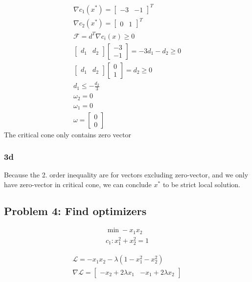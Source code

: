 \begin{subequations}
    \begin{align}
    \nabla c_1(x^*) = \begin{bmatrix}
        -3 & -1
    \end{bmatrix}^T \\ 
    \nabla c_2(x^*) = \begin{bmatrix}
        0 & 1
    \end{bmatrix}^T \\ 
    \mathcal{F} = d^T\nabla c_i(x) \geq 0 \\ 
    \begin{bmatrix}
        d_1 & d_2
    \end{bmatrix}\begin{bmatrix}
        -3 \\ 
        -1
    \end{bmatrix} = -3d_1-d_2 \geq 0 \\ 
    \begin{bmatrix}
        d_1 & d_2
    \end{bmatrix}\begin{bmatrix}
        0 \\ 
        1
    \end{bmatrix} = d_2 \geq 0 \\ 
    d_1 \leq -\frac{d_2}{3} \\ 
    \omega_2 = 0 \\ 
    \omega_1 = 0 \\ 
    \omega = \begin{bmatrix}
        0 \\ 
        0
    \end{bmatrix}
\end{align}
\end{subequations}
The critical cone only contains zero vector
\subsubsection{3d}
Because the 2. order inequality are for vectors excluding zero-vector, and we only have zero-vector in critical cone, we can conclude $x^*$ to be strict local solution.

\subsection{Problem 4: Find optimizers}

\begin{subequations}
    \begin{align}
    \min -x_1x_2 \\ 
    c_1: x_1^2+x_2^2 = 1
\end{align}
\end{subequations}

\begin{subequations}
\begin{align}
    \mathcal{L} = -x_1x_2 - \lambda (1-x_1^2-x_2^2) \\ 
    \nabla \mathcal{L} = \begin{bmatrix}
        -x_2+2\lambda x_1 & -x_1+2\lambda x_2 
        \end{bmatrix} \\ 
\end{align}
\end{subequations}










